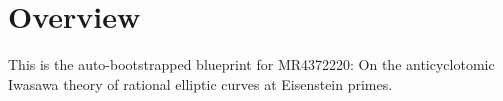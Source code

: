 \chapter{Overview}
\label{chap:overview}


This is the auto-bootstrapped blueprint for MR4372220: On the anticyclotomic Iwasawa theory of rational elliptic curves at Eisenstein primes.
